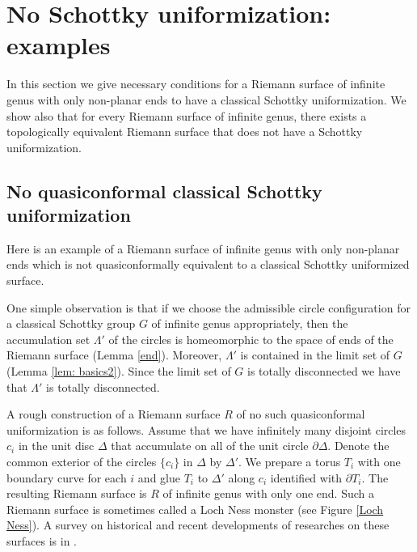 \documentclass[12pt]{amsart}
\theoremstyle{plain}
\begin{document}

\section{No Schottky uniformization: examples}
\label{sec: no Schottky uniformization: examples}

In this section we give necessary conditions for a Riemann surface of infinite genus with only  
non-planar ends to have a classical Schottky uniformization. We show also that for every Riemann surface of infinite genus,
there exists a topologically equivalent Riemann surface that does not have a Schottky uniformization.
 
\subsection{No quasiconformal classical Schottky uniformization}

Here is an example of a Riemann surface of infinite genus with only non-planar ends which is not 
quasiconformally equivalent to a classical Schottky uniformized surface.  

One simple observation is that if we choose the admissible circle configuration
for a classical Schottky group $G$ of infinite genus appropriately,
then the accumulation set $\Lambda'$ of the circles is homeomorphic to the space of ends of the Riemann surface (Lemma \ref{end}). 
Moreover, $\Lambda'$ is contained in the limit set of $G$ (Lemma \ref{lem: basics2}).
Since the limit set of $G$ is totally disconnected we have that $\Lambda'$ is totally disconnected. 

A rough construction of a Riemann surface $R$ of no such quasiconformal uniformization is as follows.
Assume that we have infinitely many disjoint circles $c_i$ in the unit disc $\Delta$ 
that accumulate on all of the unit circle $\partial \Delta$. 
Denote the common exterior of the circles $\{c_i\}$ in $\Delta$ by $\Delta'$.
We prepare a torus $T_i$ with one  boundary curve for each $i$
and glue $T_i$ to $\Delta'$ along $c_i$ identified with $\partial T_i$.
The resulting Riemann surface is $R$ of infinite genus with only one end.  
Such a Riemann surface is sometimes called a Loch Ness monster (see Figure \ref{Loch Ness}).
A survey on historical and recent developments of researches on these surfaces is in \cite{AR1}.

\end{document}
